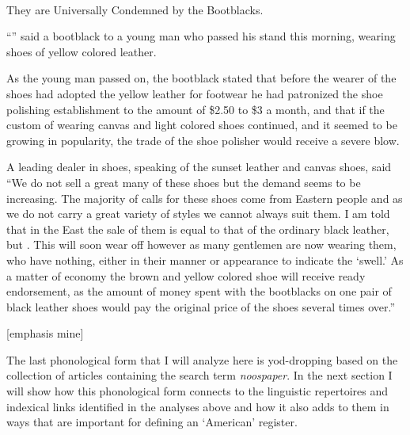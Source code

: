 \begin{ipquote}
\begin{center}
\\
They are Universally Condemned by the Bootblacks.\\
\end{center}
“” said a bootblack to a young man who passed his stand this morning, wearing sho{\kern0pt}es of yellow colored leather.

As the young man passed on, the bootblack stated that before the wearer of the sho{\kern0pt}es had adopted the yellow leather for footwear he had patronized the sho{\kern0pt}e polishing establishment to the amount of \$2.50 to \$3 a month, and that if the custom of wearing canvas and light colored sho{\kern0pt}es continued, and it seemed to be growing in popularity, the trade of the sho{\kern0pt}e polisher would receive a severe blow.

{A leading dealer in sho{\kern0pt}es, speaking of the sunset leather and canvas sho{\kern0pt}es, said “We do not sell a great many of these sho{\kern0pt}es but the demand seems to be increasing. The majority of calls for these sho{\kern0pt}es come from Eastern people and as we do not carry a great variety of styles we cannot always suit them. I am told that in the East the sale of them is equal to that of the ordinary black leather, but . This will soon wear off however as many gentlemen are now wearing them, who have nothing, either in their manner or appearance to indicate the ‘swell.’ As a matter of economy the brown and yellow colored sho{\kern0pt}e will receive ready endorsement, as the amount of money spent with the bootblacks on one pair of black leather sho{\kern0pt}es would pay the original price of the sho{\kern0pt}es several times over.”

\raggedleft
{[emphasis mine]}\\
}
\end{ipquote}


The last phonological form that I will analyze here is yod-dropping based on the collection of articles containing the search term \emph{noospaper}. In the next section I will show how this phonological form connects to the linguistic repertoires and indexical links identified in the analyses above and how it also adds to them in ways that are important for defining an ‘American’ register.


